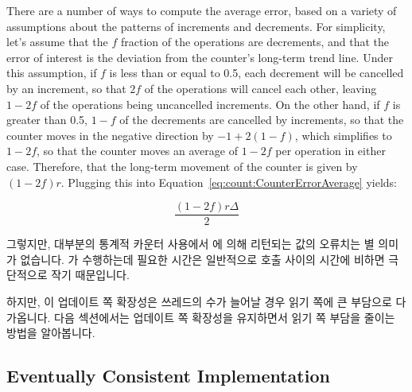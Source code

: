 \begin{lineref}
{	There are a number of ways to compute the average error,
	based on a variety of assumptions about the patterns of
	increments and decrements.
	For simplicity, let's assume that the $f$ fraction of
	the operations are decrements, and that the error of interest
	is the deviation from the counter's long-term trend line.
	Under this assumption, if $f$ is less than or equal to 0.5,
	each decrement will be cancelled by an increment, so that
	$2f$ of the operations will cancel each other, leaving
	$1-2f$ of the operations being uncancelled increments.
	On the other hand, if $f$ is greater than 0.5, $1-f$ of
	the decrements are cancelled by increments, so that the
	counter moves in the negative direction by $-1+2\left(1-f\right)$,
	which simplifies to $1-2f$, so that the counter moves an average
	of $1-2f$ per operation in either case.
	Therefore, that the long-term
	movement of the counter is given by $\left( 1-2f \right) r$.
	Plugging this into
	Equation~\ref{eq:count:CounterErrorAverage} yields:
	\fi

	\begin{equation}
		\frac{\left( 1 - 2 f \right) r \Delta}{2}
	\end{equation}

	그렇지만, 대부분의 통계적 카운터 사용에서  에 의해
	리턴되는 값의 오류치는 별 의미가 없습니다.
	 가 수행하는데 필요한 시간은 일반적으로
	 호출 사이의 시간에 비하면 극단적으로 작기 때문입니다.

} \QuickQuizEnd

하지만, 이 업데이트 쪽 확장성은 쓰레드의 수가 늘어날 경우 읽기 쪽에 큰 부담으로
다가옵니다.
다음 섹션에서는 업데이트 쪽 확장성을 유지하면서 읽기 쪽 부담을 줄이는 방법을
알아봅니다.

\subsection{Eventually Consistent Implementation}
\label{sec:count:Eventually Consistent Implementation}


\end{lineref}
